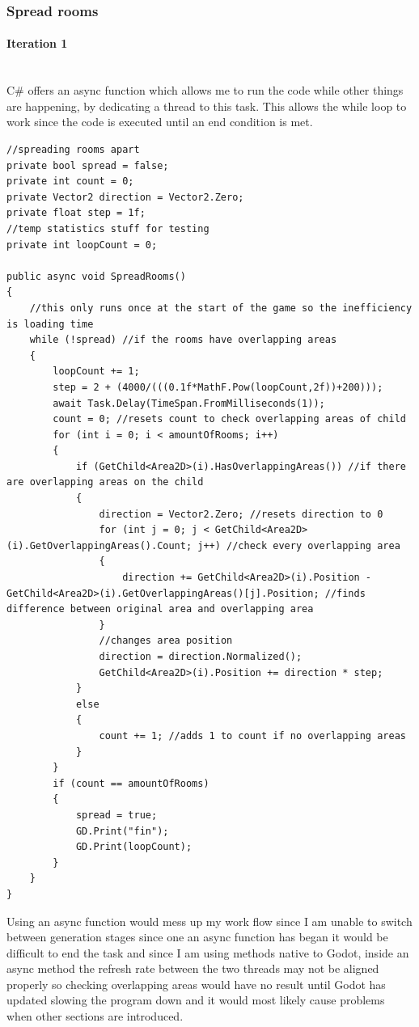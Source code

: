 \documentclass{article}
\newcommand{\myparagraph}[1]{\paragraph{#1}\mbox{}\\} %
\begin{document}
\subsubsection{Spread rooms}
\myparagraph{Iteration 1}
C\# offers an async function which allows me to run the code while other things are happening, by dedicating a thread to this task. This allows the while loop to work since the code is executed until an end condition is met.
\begin{lstlisting}
//spreading rooms apart
private bool spread = false;
private int count = 0;
private Vector2 direction = Vector2.Zero;
private float step = 1f;
//temp statistics stuff for testing
private int loopCount = 0;

public async void SpreadRooms()
{
    //this only runs once at the start of the game so the inefficiency is loading time
    while (!spread) //if the rooms have overlapping areas
    {
        loopCount += 1;
        step = 2 + (4000/(((0.1f*MathF.Pow(loopCount,2f))+200)));
        await Task.Delay(TimeSpan.FromMilliseconds(1));
        count = 0; //resets count to check overlapping areas of child
        for (int i = 0; i < amountOfRooms; i++)
        {
            if (GetChild<Area2D>(i).HasOverlappingAreas()) //if there are overlapping areas on the child
            {
                direction = Vector2.Zero; //resets direction to 0
                for (int j = 0; j < GetChild<Area2D>(i).GetOverlappingAreas().Count; j++) //check every overlapping area
                {
                    direction += GetChild<Area2D>(i).Position - GetChild<Area2D>(i).GetOverlappingAreas()[j].Position; //finds difference between original area and overlapping area
                }
                //changes area position
                direction = direction.Normalized();
                GetChild<Area2D>(i).Position += direction * step;
            }
            else
            {
                count += 1; //adds 1 to count if no overlapping areas
            }
        }
        if (count == amountOfRooms)
        {
            spread = true;
            GD.Print("fin");
            GD.Print(loopCount);
        }
    }
}
\end{lstlisting}
Using an async function would mess up my work flow since I am unable to switch between generation stages since one an async function has began it would be difficult to end the task and since I am using methods native to Godot, inside an async method the refresh rate between the two threads may not be aligned properly so checking overlapping areas would have no result until Godot has updated slowing the program down and it would most likely cause problems when other sections are introduced.
\end{document}
